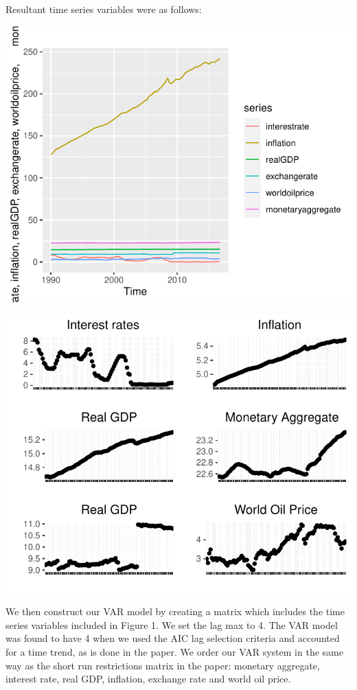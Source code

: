 \documentclass[11pt,preprint, authoryear]{elsarticle}
\numberwithin{equation}{section}
\numberwithin{figure}{section}
\numberwithin{table}{section}
\begin{document}
Resultant time series variables were as follows:

\begin{center}\includegraphics{README_files/figure-latex/unnamed-chunk-1-1} \end{center}

\begin{center}\includegraphics{README_files/figure-latex/unnamed-chunk-2-1} \end{center}

We then construct our VAR model by creating a matrix which includes the
time series variables included in Figure 1. We set the lag max to 4. The
VAR model was found to have 4 when we used the AIC lag selection
criteria and accounted for a time trend, as is done in the paper. We
order our VAR system in the same way as the short run restrictions
matrix in the paper: monetary aggregate, interest rate, real GDP,
inflation, exchange rate and world oil price.
\end{document}
